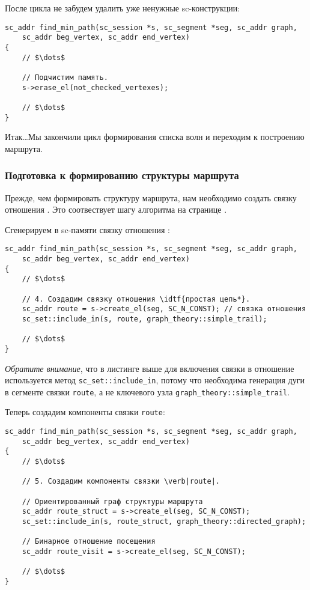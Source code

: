 После цикла не забудем удалить уже ненужные sc-конструкции:
\begin{lstlisting}[texcl]
sc_addr find_min_path(sc_session *s, sc_segment *seg, sc_addr graph,
    sc_addr beg_vertex, sc_addr end_vertex)
{
    // $\dots$

    // Подчистим память.
    s->erase_el(not_checked_vertexes);

    // $\dots$
}
\end{lstlisting}

Итак\dots Мы закончили цикл формирования списка волн и переходим к
построению маршрута.

\subsubsection{Подготовка к формированию структуры маршрута}
\label{sec:libscprg_fmp_before_build_route}

Прежде, чем формировать структуру маршрута, нам необходимо создать
связку отношения . Это соотвествует шагу алгоритма
на странице \pageref{astep:S8_Create_route_tuple}.

Сгенерируем в sc-памяти связку отношения :
\begin{lstlisting}[texcl]
sc_addr find_min_path(sc_session *s, sc_segment *seg, sc_addr graph,
    sc_addr beg_vertex, sc_addr end_vertex)
{
    // $\dots$

    // 4. Создадим связку отношения \idtf{простая цепь*}.
    sc_addr route = s->create_el(seg, SC_N_CONST); // связка отношения
    sc_set::include_in(s, route, graph_theory::simple_trail);

    // $\dots$
}
\end{lstlisting}

\emph{Обратите внимание}, что в листинге выше для включения связки в
отношение используется метод \lstinline|sc_set::include_in|, потому
что необходима генерация дуги в сегменте связки \lstinline|route|, а
не ключевого узла \lstinline|graph_theory::simple_trail|.

Теперь создадим компоненты связки \lstinline|route|:
\begin{lstlisting}[texcl]
sc_addr find_min_path(sc_session *s, sc_segment *seg, sc_addr graph,
    sc_addr beg_vertex, sc_addr end_vertex)
{
    // $\dots$

    // 5. Создадим компоненты связки \verb|route|.
    
    // Ориентированный граф структуры маршрута
    sc_addr route_struct = s->create_el(seg, SC_N_CONST);
    sc_set::include_in(s, route_struct, graph_theory::directed_graph);
    
    // Бинарное отношение посещения
    sc_addr route_visit = s->create_el(seg, SC_N_CONST);

    // $\dots$
}
\end{lstlisting}

